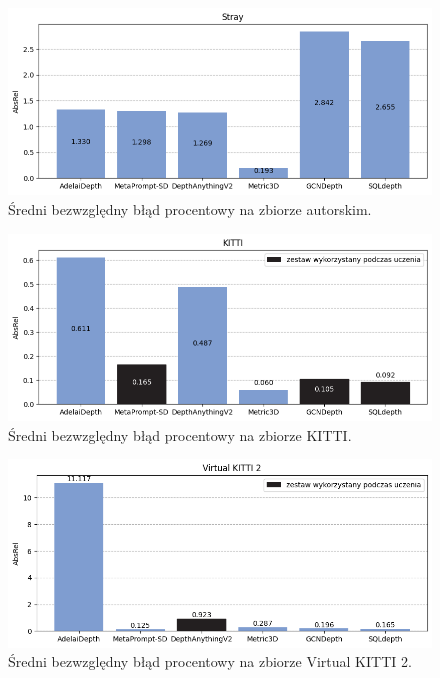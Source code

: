 \begin{figure}[H]
    \centering
    \includegraphics{plots/absrel/3}
    \caption{Średni bezwzględny błąd procentowy na zbiorze autorskim.}
    \label{fig:absrel_3}
\end{figure}
\begin{figure}[H]
    \centering
    \includegraphics{plots/absrel/4}
    \caption{Średni bezwzględny błąd procentowy na zbiorze KITTI.}
    \label{fig:absrel_4}
\end{figure}
\begin{figure}[H]
    \centering
    \includegraphics{plots/absrel/5}
    \caption{Średni bezwzględny błąd procentowy na zbiorze Virtual KITTI 2.}
    \label{fig:absrel_5}
\end{figure}
